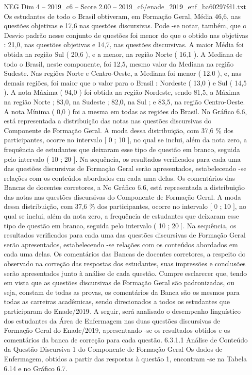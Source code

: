\begin{textsample}{NEG Dim 4 – 2019\_c6 – Score 2.00 – 2019\_c6/enade\_2019\_enf\_ba60297fd1.txt}
Os estudantes de todo o Brasil obtiveram, em Formação Geral, Média 46,6, nas questões objetivas e 17,6 nas questões discursivas.
Pode -se notar, também, que o Desvio padrão nesse conjunto de questões foi menor do que o obtido nas objetivas : 21,0, nas questões objetivas e 14,7, nas questões discursivas.
A maior Média foi obtida na região Sul ( 20,6 ), e a menor, na região Norte ( 16,1 ).
A Mediana de todo o Brasil, neste componente, foi 12,5, mesmo valor da Mediana na região Sudeste.
Nas regiões Norte e Centro-Oeste, a Mediana foi menor ( 12,0 ), e, nas demais regiões, foi maior que o valor para o Brasil : Nordeste ( 13,0 ) e Sul ( 14,5 ).
A nota Máxima ( 94,0 ) foi obtida na região Nordeste, sendo 81,5, a Máxima na região Norte ; 83,0, na Sudeste ; 82,0, na Sul ; e 83,5, na região Centro-Oeste.
A nota Mínima ( 0,0 ) foi a mesma em todas as regiões do Brasil.
No Gráfico 6.6, está representada a distribuição das notas nas questões discursivas do Componente de Formação Geral.
A moda dessa distribuição, com 37,6 \% dos participantes, ocorre no intervalo [ 0 ; 10 ], no qual se inclui, além da nota zero, a frequência de estudantes que deixaram esse tipo de questão em branco, seguida pelo intervalo ( 10 ; 20 ].
Na sequência, os resultados verificados para cada uma das questões discursivas de Formação Geral serão apresentados, estabelecendo -se relações com os conteúdos abordados em cada uma delas.
Os comentários das Bancas de docentes corretores, a No Gráfico 6.6, está representada a distribuição das notas nas questões discursivas do Componente de Formação Geral.
A moda dessa distribuição, com 37,6 \% dos participantes, ocorre no intervalo [ 0 ; 10 ], no qual se inclui, além da nota zero, a frequência de estudantes que deixaram esse tipo de questão em branco, seguida pelo intervalo ( 10 ; 20 ].
Na sequência, os resultados verificados para cada uma das questões discursivas de Formação Geral serão apresentados, estabelecendo -se relações com os conteúdos abordados em cada uma delas.
Os comentários das Bancas de docentes corretores, a respeito do observado na correção das respostas dos estudantes, suas impressões e conclusões serão apresentados junto à análise de cada questão.
Cumpre esclarecer que, tendo em vista que as questões discursivas de Formação Geral são padronizadas, ou seja, constam de todas as provas, os comentários da Banca são os mesmos para todas as carreiras acadêmicas, sendo direcionados a todos os estudantes que participaram do Enade/2019.
A seguir, será analisado o desempenho linguístico dos estudantes da Área de Enfermagem nas duas questões discursivas de Formação Geral do Enade/2019, apresentando -se os resultados obtidos e os comentários da banca de correção para cada questão. 6.3.1.1 Análise de Conteúdo da Questão Discursiva 1 do Componente de Formação Geral Os dados de Enfermagem, obtidos a partir das respostas à questão 1, encontram -se na Tabela 6.14 e no Gráfico 6.7.

\end{textsample}

